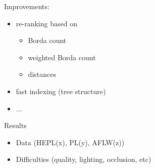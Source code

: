 \begin{xpsectionbox}{}{}
\begin{minipage}{0.5\linewidth}
\end{minipage}
\begin{minipage}{0.5\linewidth}
Improvements:
\begin{itemize}
	  \item re-ranking based on
	  	\begin{itemize}
	  		\item Borda count
	  		\item weighted Borda count
	  		\item distances
	  	\end{itemize}
	  \item fast indexing (tree structure)
	  \item ...
\end{itemize}
\begin{center}
\end{center}
\end{minipage}
\end{xpsectionbox}


\begin{xpsectionbox}{Results}{}

\begin{itemize}
	\item Data (HEPL(x), PL(y), AFLW(z))
	\item Difficulties (quality, lighting, occlusion, etc)
	
		
\end{itemize}
\end{xpsectionbox}

